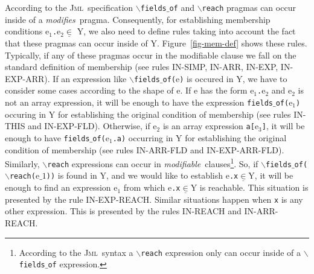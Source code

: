 \documentclass[a4paper]{llncs}
\newcommand{\jml}{\textsc{Jml}}
\newcommand{\modif}{\textit{modifiable}}
\newcommand{\modifies}{\textit{modifies}}
\begin{document}
According to the \jml~specification
\texttt{$\backslash$fields}$\_$\texttt{of} and
\texttt{$\backslash$reach} pragmas can occur inside of a
\modifies~pragma. Consequently, for establishing membership conditions
\textup{e}$_1$\texttt{.}\textup{e}$_2$$\underline\in$ \textsc{Y}, we
also need
to define rules taking into account the fact that these pragmas can
occur inside of \textsc{Y}. Figure~\ref{fig-mem-def} shows these
rules. Typically, if any of these pragmas occur in the modifiable
clause we fall on the standard definition of membership (see rules
\textup{IN-SIMP},  \textup{IN-ARR}, \textup{IN-EXP},
\textup{IN-EXP-ARR}). If an expression
like
$\backslash$\texttt{fields}$\_$\texttt{of(}\textup{e}\texttt{)} is
occured in \textsc{Y}, we
have to consider some cases according to the shape of \textup{e}. If
\textup{e} has the form \textup{e}$_1$\texttt{.}\textup{e}$_2$ and
\textup{e}$_2$ is not an array expression, it will be enough to have
the expression \texttt{fields$\_$of(}\textup{e}$_1$\texttt{)} occuring 
in \textsc{Y} for 
establishing the original condition of membership (see rules
\textup{IN-THIS} and \textup{IN-EXP-FLD}). Otherwise, if
\textup{e}$_2$ is an array expression
\texttt{a[}\textup{e}$_3$\texttt{]}, 
it will be enough to have
\texttt{fields$\_$of(}\textup{e}$_1$\texttt{.a}\texttt{)} occurring in
\textsc{Y} for establishing the original condition of membership
(see rules \textup{IN-ARR-FLD} and
\textup{IN-EXP-ARR-FLD}). Similarly, $\backslash$\texttt{reach}
expressions can occur in \modif~clauses\footnote{According to the
\jml~syntax a
$\backslash$\texttt{reach} expression only can occur inside of a
$\backslash$\texttt{fields}$\_$\texttt{of} expression.}. So, if
$\backslash$\texttt{fields}$\_$\texttt{of($\backslash$reach(}\textup{e}$\_1$\texttt{))}
is found in \textsc{Y}, and we would like to establish
\textup{e}\texttt{.x}$\underline\in$\textsc{Y}, it will be enough to
find an expression \textup{e}$_1$ from which
\textup{e}\texttt{.x}$\underline\in$\textsc{Y} is reachable. This
situation is presented by the rule \textup{IN-EXP-REACH}. Similar
situations happen when \texttt{x} is any other expression. This
is presented by the rules \textup{IN-REACH} and
\textup{IN-ARR-REACH}. 
\end{document}
